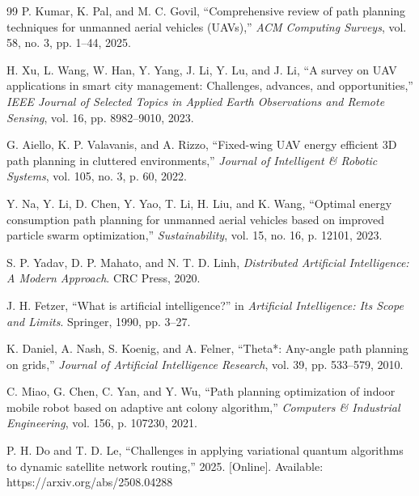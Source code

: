 {\small
\begin{thebibliography}{99}
%
%
%
P. Kumar, K. Pal, and M. C. Govil, ``Comprehensive review of path planning techniques for unmanned aerial vehicles (UAVs),'' \textit{ACM Computing Surveys}, vol. 58, no. 3, pp. 1--44, 2025.

H. Xu, L. Wang, W. Han, Y. Yang, J. Li, Y. Lu, and J. Li, ``A survey on UAV applications in smart city management: Challenges, advances, and opportunities,'' \textit{IEEE Journal of Selected Topics in Applied Earth Observations and Remote Sensing}, vol. 16, pp. 8982--9010, 2023.

G. Aiello, K. P. Valavanis, and A. Rizzo, ``Fixed-wing UAV energy efficient 3D path planning in cluttered environments,'' \textit{Journal of Intelligent \& Robotic Systems}, vol. 105, no. 3, p. 60, 2022.

Y. Na, Y. Li, D. Chen, Y. Yao, T. Li, H. Liu, and K. Wang, ``Optimal energy consumption path planning for unmanned aerial vehicles based on improved particle swarm optimization,'' \textit{Sustainability}, vol. 15, no. 16, p. 12101, 2023.

S. P. Yadav, D. P. Mahato, and N. T. D. Linh, \textit{Distributed Artificial Intelligence: A Modern Approach}. CRC Press, 2020.

J. H. Fetzer, ``What is artificial intelligence?'' in \textit{Artificial Intelligence: Its Scope and Limits}. Springer, 1990, pp. 3--27.

K. Daniel, A. Nash, S. Koenig, and A. Felner, ``Theta*: Any-angle path planning on grids,'' \textit{Journal of Artificial Intelligence Research}, vol. 39, pp. 533--579, 2010.

C. Miao, G. Chen, C. Yan, and Y. Wu, ``Path planning optimization of indoor mobile robot based on adaptive ant colony algorithm,'' \textit{Computers \& Industrial Engineering}, vol. 156, p. 107230, 2021.

P. H. Do and T. D. Le, ``Challenges in applying variational quantum algorithms to dynamic satellite network routing,'' 2025. [Online]. Available: https://arxiv.org/abs/2508.04288


\end{thebibliography}}
